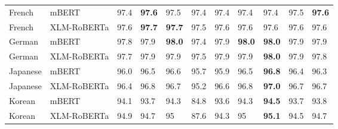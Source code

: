 \begin{tabular}{llrllrrllrl}
           French &          mBERT &           97.4 &   \textbf{97.6} &         97.5 &            97.4 &           97.4 &           97.4 &          97.4 &          97.5 &   \textbf{97.6} \\
           French &    XLM-RoBERTa &           97.6 &   \textbf{97.7} &   \textbf{97.7} &            97.5 &           97.6 &           97.6 &          97.6 &          97.6 &         97.6 \\
           German &          mBERT &           97.8 &         97.9 &   \textbf{98.0} &            97.4 &           97.9 &     \textbf{98.0} &    \textbf{98.0} &          97.9 &         97.9 \\
           German &    XLM-RoBERTa &           97.7 &         97.9 &         97.9 &            97.5 &           97.9 &           97.9 &    \textbf{98.0} &          97.9 &         97.8 \\
         Japanese &          mBERT &           96.0 &         96.5 &         96.6 &            95.7 &           95.9 &           96.5 &    \textbf{96.8} &          96.4 &         96.3 \\
         Japanese &    XLM-RoBERTa &           96.4 &         96.8 &         96.7 &            95.2 &           96.6 &           96.8 &    \textbf{97.0} &          96.7 &         96.7 \\
           Korean &          mBERT &           94.1 &         93.7 &         94.3 &            84.8 &           93.6 &           94.3 &    \textbf{94.5} &          93.7 &         93.8 \\
           Korean &    XLM-RoBERTa &           94.9 &         94.7 &           95 &            87.6 &           94.3 &             95 &    \textbf{95.1} &          94.5 &         94.7 \\
\bottomrule
\end{tabular}
